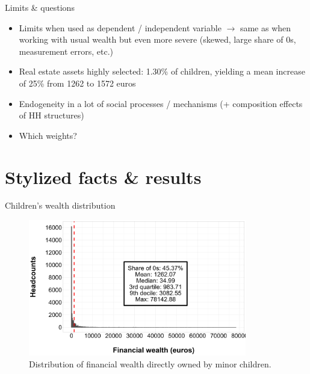 \documentclass[xolor = dvipsnames, compress]{beamer} %
\begin{document}

\begin{frame}[label = dep_indep]{Limits \& questions}    
	\begin{itemize}\setlength{\itemsep}{15pt}
		\item Limits when used as dependent / independent variable $\rightarrow$ same as when working with usual wealth but even more severe (skewed, large share of $0$s, measurement errors, etc.)
		\item Real estate assets highly selected: 1.30\% of children, yielding a mean increase of 25\% from 1262 to 1572 euros 
		\item Endogeneity in a lot of social processes / mechanisms (+ composition effects of HH structures)
		\item Which weights?
	\end{itemize}
\end{frame}


\section{Stylized facts \& results}


\begin{frame}[label = distrib]{Children's wealth distribution}    
	\begin{figure}[h]
		\centering
		\includegraphics[width = 0.85\textwidth, height = 0.85\textheight, keepaspectratio]{wealthall_distrib_raw.png}
		\caption{\scriptsize{Distribution of financial wealth directly owned by minor children.}}
	\end{figure}
\end{frame}
\end{document}
